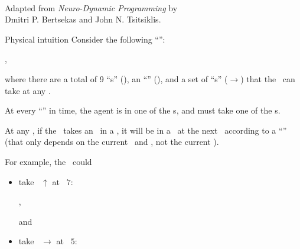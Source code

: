 \begin{center}
{\LARGE {}}\\
\vspace{10pt}
\normalsize 
Adapted from
{\it Neuro-Dynamic  Programming}
by \\
Dmitri P. Bertsekas
and
John N. Tsitsiklis.
\end{center}

\begin{part} {Physical intuition}
  Consider the following ``\brd'':\\
  \begin{center}
    ,
  \end{center}
  where there are a total of 9 ``\til{}s'' (), 
  an ``\agt'' (), and
  a set of ``\act{}s'' ($\rightarrow$) that the \agt\ can take at any \til.

  At every ``\stp'' in time, the agent is in one of the \til{}s,
  and must take one of the \act{}s. 

  At any \stp, if the \agt\ takes an \act\ in a \til, 
  it will be in a \til\ at the next \stp\ according to a ``\trd''
  (that only depends on the current \til\ and \act, not the current \stp).

  For example, the \agt\ could
  \begin{itemize}
    \def\tilesep{3.2}
    \def\tscale{0.6}
    \item take \act\ $\uparrow$ at \til\ $7$:
      \begin{center}
        ,
      \end{center}
      and
    \item take \act\ $\rightarrow$ at \til\ $5$:
      \begin{center}
\end{center}
\end{itemize}
\end{part}
